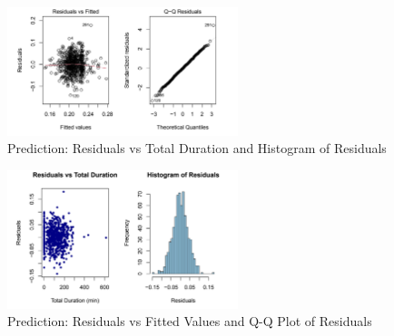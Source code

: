 \documentclass{article}
\begin{document}
\begin{figure}[h!]
  \centering
  \includegraphics[width=0.6\textwidth]{images/pred_model_backward_plot1.png}
  \caption{Prediction: Residuals vs Total Duration and Histogram of Residuals}
  \label{fig:residuals_total_duration}
\end{figure}

\begin{figure}[h!]
  \centering
  \includegraphics[width=0.6\textwidth]{images/pred_model_backward_plot2.png}
  \caption{Prediction: Residuals vs Fitted Values and Q-Q Plot of Residuals}
  \label{fig:residuals_fitted_qq}
\end{figure}
\end{document}
